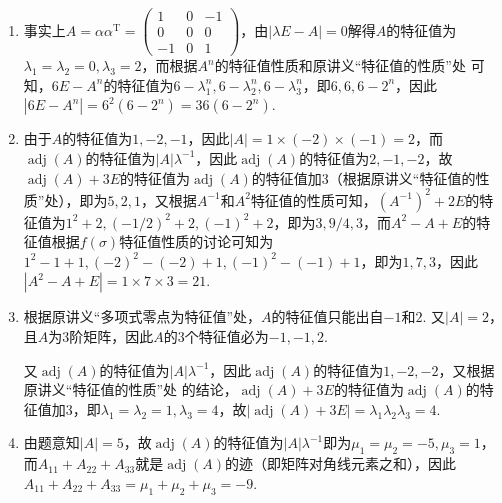 \documentclass[12pt,fontset=fandol]{ctexart}
\begin{document}
\begin{solve}
\begin{enumerate}
        \item 事实上$A=\alpha\alpha^\mathrm{T}=\begin{pmatrix}
                      1 & 0 & -1 \\ 0 & 0 & 0 \\ -1 & 0 & 1
                  \end{pmatrix}$，由$|\lambda E-A|=0$解得$A$的特征值为$\lambda_1=\lambda_2=0,\lambda_3=2$，而根据$A^n$的特征值性质和原讲义“特征值的性质”处 可知，$6E-A^n$的特征值为$6-\lambda_1^n,6-\lambda_2^n,6-\lambda_3^n$，即$6,6,6-2^n$，因此$|6E-A^n|=6^2(6-2^n)=36(6-2^n)$.

        \item 由于$A$的特征值为$1,-2,-1$，因此$|A|=1\times(-2)\times(-1)=2$，而$\operatorname{adj}(A)$的特征值为$|A|\lambda^{-1}$，因此$\operatorname{adj}(A)$的特征值为$2,-1,-2$，故$\operatorname{adj}(A)+3E$的特征值为$\operatorname{adj}(A)$的特征值加3（根据原讲义“特征值的性质”处），即为$5,2,1$，又根据$A^{-1}$和$A^2$特征值的性质可知，$(A^{-1})^2+2E$的特征值为$1^2+2,(-1/2)^2+2,(-1)^2+2$，即为$3,9/4,3$，而$A^2-A+E$的特征值根据$f(\sigma)$特征值性质的讨论可知为$1^2-1+1,(-2)^2-(-2)+1,(-1)^2-(-1)+1$，即为$1,7,3$，因此$|A^2-A+E|=1\times 7\times 3=21$.

        \item 根据原讲义“多项式零点为特征值”处，$A$的特征值只能出自$-1$和$2$. 又$|A|=2$，且$A$为3阶矩阵，因此$A$的3个特征值必为$-1,-1,2$.

              又$\operatorname{adj}(A)$的特征值为$|A|\lambda^{-1}$，因此$\operatorname{adj}(A)$的特征值为$1,-2,-2$，又根据原讲义“特征值的性质”处 的结论，$\operatorname{adj}(A)+3E$的特征值为$\operatorname{adj}(A)$的特征值加3，即$\lambda_1=\lambda_2=1,\lambda_3=4$，故$|\operatorname{adj}(A)+3E|=\lambda_1\lambda_2\lambda_3=4$.

        \item 由题意知$|A|=5$，故$\operatorname{adj}(A)$的特征值为$|A|\lambda^{-1}$即为$\mu_1=\mu_2=-5,\mu_3=1$，而$A_{11}+A_{22}+A_{33}$就是$\operatorname{adj}(A)$的迹（即矩阵对角线元素之和），因此$A_{11}+A_{22}+A_{33}=\mu_1+\mu_2+\mu_3=-9$.
    \end{enumerate}
\end{solve}
\end{document}
